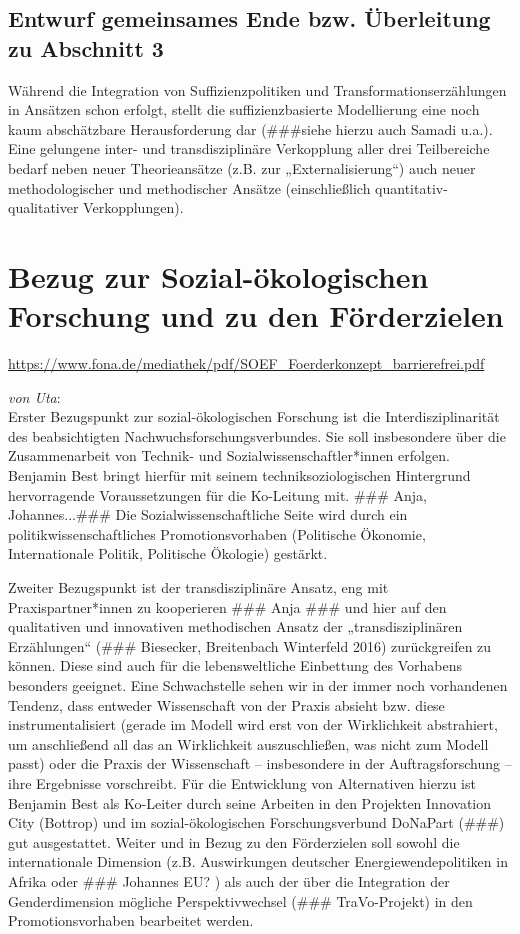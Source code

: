\documentclass[a4paper,11pt,twoside]{scrartcl}
\begin{document}
\subsection*{Entwurf gemeinsames Ende bzw. Überleitung zu Abschnitt 3}
Während die Integration von Suffizienzpolitiken und Transformationserzählungen in Ansätzen schon erfolgt, stellt die suffizienzbasierte Modellierung eine noch kaum abschätzbare Herausforderung dar (###siehe hierzu auch Samadi u.a.). Eine gelungene inter- und transdisziplinäre Verkopplung aller drei Teilbereiche bedarf neben neuer Theorieansätze (z.B. zur „Externalisierung“) auch neuer methodologischer und methodischer Ansätze (einschließlich quantitativ-qualitativer Verkopplungen). 


\section{Bezug zur Sozial-ökologischen Forschung und zu den Förderzielen}

\url{https://www.fona.de/mediathek/pdf/SOEF_Foerderkonzept_barrierefrei.pdf}


\textit{von Uta}:\\
Erster Bezugspunkt zur sozial-ökologischen Forschung ist die Interdisziplinarität des beabsichtigten Nachwuchsforschungsverbundes. Sie soll insbesondere über die Zusammenarbeit von Technik- und Sozialwissenschaftler*innen erfolgen. Benjamin Best bringt hierfür mit seinem techniksoziologischen Hintergrund hervorragende Voraussetzungen für die Ko-Leitung mit. ### Anja, Johannes...### Die Sozialwissenschaftliche Seite wird durch ein politikwissenschaftliches Promotionsvorhaben (Politische Ökonomie, Internationale Politik, Politische Ökologie) gestärkt.

Zweiter Bezugspunkt ist der transdisziplinäre Ansatz, eng mit Praxispartner*innen zu kooperieren ### Anja ### und hier auf den qualitativen und innovativen methodischen Ansatz der „transdisziplinären Erzählungen“ (### Biesecker, Breitenbach Winterfeld 2016) zurückgreifen zu können. Diese sind auch für die lebensweltliche Einbettung des Vorhabens besonders geeignet. Eine Schwachstelle sehen wir in der immer noch vorhandenen Tendenz, dass entweder Wissenschaft von der Praxis absieht bzw. diese instrumentalisiert (gerade im Modell wird erst von der Wirklichkeit abstrahiert, um anschließend all das an Wirklichkeit auszuschließen, was nicht zum Modell passt) oder die Praxis der Wissenschaft – insbesondere in der Auftragsforschung – ihre Ergebnisse vorschreibt. Für die Entwicklung von Alternativen hierzu ist Benjamin Best als Ko-Leiter durch seine Arbeiten in den Projekten Innovation City (Bottrop) und im sozial-ökologischen Forschungsverbund DoNaPart (###) gut ausgestattet.
Weiter und in Bezug zu den Förderzielen soll sowohl die internationale Dimension (z.B. Auswirkungen deutscher Energiewendepolitiken in Afrika oder ### Johannes EU? ) als auch der über die Integration der Genderdimension mögliche Perspektivwechsel (### TraVo-Projekt) in den Promotionsvorhaben bearbeitet werden.
\end{document}
